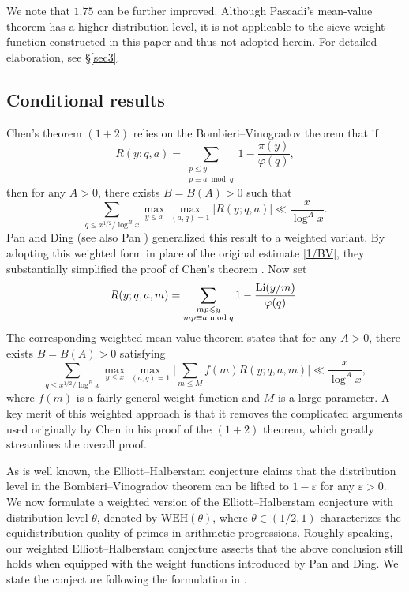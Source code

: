 \documentclass[12pt, a4paper]{amsart}
\def\Li{\hbox{{\rm Li}}}
\def\leq{\leqslant}
\theoremstyle{plain}
\theoremstyle{remark}
\numberwithin{equation}{section}
\begin{document}
We note that $1.75$ can be further improved.  
Although Pascadi's mean-value theorem \cite{Pas24} has a higher distribution level, it is not 
applicable to the sieve weight function constructed in this paper and thus not 
adopted herein. For detailed elaboration, see \S \ref{sec3}. 

\subsection{Conditional results}
Chen's theorem $(1+2)$ relies on the Bombieri--Vinogradov theorem
that if 
\[
R(y; q, a)
=\sum_{\substack{p\leq y \\ p \equiv a \bmod q}} 1 
-\frac{\pi(y)}{\varphi(q)},  
\]
then for any $A>0$, there exists $B=B(A)>0$ such that
\begin{equation}\label{1/BV}
\sum_{q\leq x^{1/2}/\log^{B}x} \max_{y\leq x} \max_{(a,q)=1} 
| R(y; q, a) |
\ll \frac{x}{\log^A x}. 
\end{equation}
Pan and Ding \cite{PanDing79} (see also Pan \cite{Pan/HH}) generalized this result to a weighted variant. 
By adopting this weighted form in place of the original estimate \eqref{1/BV}, they substantially simplified the proof of Chen's theorem \cite{Chen66, Chen73}. Now set
\begin{equation}\label{WBV/Err}
R(y; q, a, m)
=\sum_{\substack{ m p\leq y \\ m p \equiv a \bmod q}} 1 
 -\dfrac{\Li(y/m)}{\varphi(q)}. 
\end{equation}
The corresponding weighted mean-value theorem states that for any $A>0$, there exists $B=B(A)>0$ satisfying
\begin{equation}\label{W/BV}
\sum_{q\leq x^{1/2}/\log^{B}x} \max_{y\leq x} \max_{(a,q)=1} 
\bigg| \sum_{m\leq M} f(m) R(y; q, a, m) \bigg|
\ll \frac{x}{\log^A x}, 
\end{equation}
where $f(m)$ is a fairly general weight function and $M$ is a large parameter. A key merit of this weighted approach is that it removes the complicated arguments used originally by Chen in his proof of the $(1+2)$ theorem, which greatly streamlines the overall proof.

As is well known, the Elliott--Halberstam conjecture claims that the distribution level in the Bombieri--Vinogradov theorem can be lifted to $1-\varepsilon$ for any $\varepsilon>0$. We now formulate a weighted version of the Elliott--Halberstam conjecture with distribution level $\theta$, denoted by $\mathrm{WEH}(\theta)$, where $\theta \in (1/2, 1)$ characterizes the equidistribution quality of primes in arithmetic progressions. Roughly speaking, our weighted Elliott--Halberstam conjecture asserts that the above conclusion still holds when equipped with the weight functions introduced by Pan and Ding. We state the conjecture following the formulation in \cite[\S 8]{PanPan92}.
\end{document}
